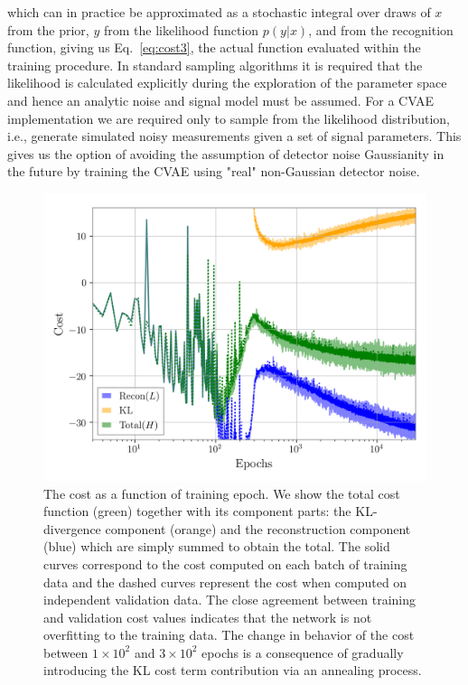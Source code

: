 %
which can in practice be approximated as a stochastic integral over draws of
$x$ from the prior, $y$ from the likelihood function $p(y|x)$, and from the
recognition function, giving us Eq.~\ref{eq:cost3}, the actual function
evaluated within the training procedure. In standard sampling algorithms it is
required that the likelihood is calculated explicitly during the exploration of
the parameter space and hence an analytic noise and signal model must be
assumed. For a \ac{CVAE} implementation we are required only to sample from
the likelihood distribution, i.e., generate simulated noisy measurements given a
set of signal parameters. This gives us the option of avoiding the assumption
of detector noise Gaussianity in the future by training the \ac{CVAE} using "real"
non-Gaussian detector noise.

%
%
\begin{figure}
    \includegraphics[width=\columnwidth]{inv_losses_log.png}
\caption{\label{fig:loss_log} The cost as a function of training epoch.
We show the total cost function (green) together with its component parts:
the \ac{KL}-divergence component (orange) and the reconstruction component
(blue) which are simply summed to obtain the total. The solid curves correspond
to the cost computed on each batch of training data and the dashed curves
represent the cost when computed on independent validation data. The close
agreement between training and validation cost values indicates that the
network is not overfitting to the training data. The change in behavior of the
cost between $1\times10^2$ and $3\times10^2$ epochs is a consequence of gradually
introducing the \ac{KL} cost term contribution via an annealing process.} 
\end{figure}

